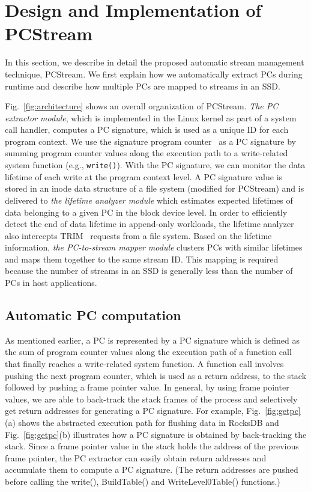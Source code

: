 \section{Design and Implementation of \textsf{PCStream}}
In this section, we describe in detail the proposed automatic stream management technique,
\textsf{\small PCStream}.  We first explain how we automatically extract PCs during
runtime and describe how multiple PCs are mapped to streams in an SSD.

Fig.~\ref{fig:architecture} shows an overall organization of \textsf{\small PCStream}.
\textit{The PC extractor module}, which is implemented in the Linux kernel as
part of a system call handler, 
computes a PC signature, which is used as a unique ID for each program context.  
We use the signature program counter~\cite{PC} as a PC signature 
by summing program counter values along the execution path to a write-related system function 
(e.g., {\tt write()}).  
With the PC signature, we can monitor the data lifetime of each write at the program context level. 
A PC signature value is stored
in an inode data structure of a file system (modified for \textsf{\small PCStream})
and is delivered to \textit{the lifetime analyzer module} which estimates
expected lifetimes of data belonging to a given PC in the block device level.
In order to efficiently detect the end of data lifetime in append-only
workloads, the lifetime analyzer also intercepts TRIM~\cite{TRIM} requests from a file system.  %
Based on the lifetime information, \textit{the PC-to-stream
mapper module} clusters PCs with similar lifetimes and maps them together to
the same stream ID.  This mapping is required because 
the number of streams in an SSD is generally less than the number of PCs in host applications.

\subsection{Automatic PC computation}
As mentioned earlier, a PC is represented by a PC signature which is defined as
the sum of program counter values along the execution path of a function call that
finally reaches a write-related system function. A function call involves
pushing the next program counter, which is used as a return address, to the
stack followed by pushing a frame pointer value.  In general, by using frame
pointer values, we are able to back-track the stack frames of the process and
selectively get return addresses for generating a PC signature.  For example,
Fig.~\ref{fig:getpc}(a) shows the abstracted execution path for flushing data
in RocksDB and Fig.~\ref{fig:getpc}(b) illustrates how a PC signature is obtained
by back-tracking the stack.  
Since a frame pointer value in the stack holds the address of the previous
frame pointer, the PC extractor can easily obtain return addresses and
accumulate them to compute a PC signature. 
(The return addresses are pushed
before calling the \textsf{\small  write()}, \textsf{\small  BuildTable()} and \textsf{\small 
WriteLevel0Table()} functions.)

